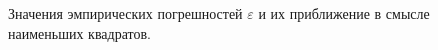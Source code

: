 \documentclass[12pt, a4paper]{article}
\begin{document}
\begin{figure}[H]
\caption{Значения эмпирических погрешностей $\varepsilon$ и их приближение в смысле наименьших квадратов.}
\end{figure}

\end{document}
